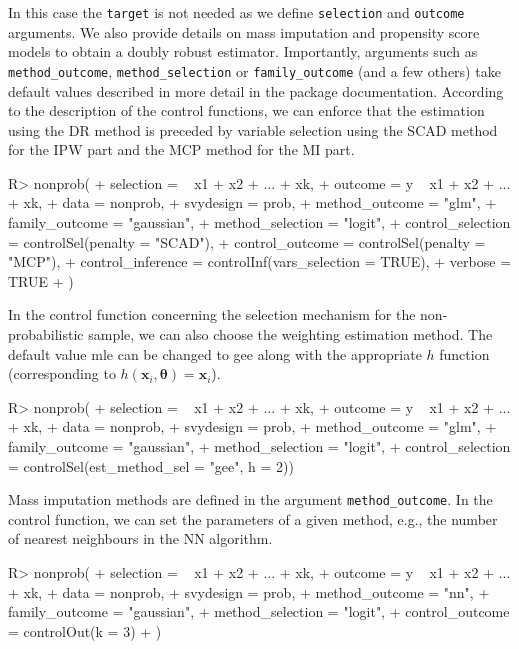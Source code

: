 \documentclass[
]{jss}
\begin{document}
In this case the \texttt{target} is not needed as we define
\texttt{selection} and \texttt{outcome} arguments. We also provide
details on mass imputation and propensity score models to obtain a
doubly robust estimator. Importantly, arguments such as
\texttt{method\_outcome}, \texttt{method\_selection} or
\texttt{family\_outcome} (and a few others) take default values
described in more detail in the package documentation. According to the
description of the control functions, we can enforce that the estimation
using the DR method is preceded by variable selection using the SCAD
method for the IPW part and the MCP method for the MI part.

\begin{CodeChunk}
\begin{CodeInput}
R> nonprob(
+   selection = ~ x1 + x2 + ... + xk, 
+   outcome = y ~ x1 + x2 + ... + xk, 
+   data = nonprob, 
+   svydesign = prob, 
+   method_outcome = "glm", 
+   family_outcome = "gaussian",
+   method_selection = "logit",
+   control_selection = controlSel(penalty = "SCAD"),
+   control_outcome = controlSel(penalty = "MCP"),
+   control_inference = controlInf(vars_selection = TRUE),
+   verbose = TRUE
+ )
\end{CodeInput}
\end{CodeChunk}

In the control function concerning the selection mechanism for the
non-probabilistic sample, we can also choose the weighting estimation
method. The default value mle can be changed to gee along with the
appropriate \(h\) function (corresponding to
\(h\left(\boldsymbol{x}_i, \boldsymbol{\theta}\right) = \boldsymbol{x}_i\)).

\begin{CodeChunk}
\begin{CodeInput}
R> nonprob(
+   selection = ~ x1 + x2 + ... + xk, 
+   outcome = y ~ x1 + x2 + ... + xk, 
+   data = nonprob, 
+   svydesign = prob, 
+   method_outcome = "glm", 
+   family_outcome = "gaussian",
+   method_selection = "logit",
+   control_selection = controlSel(est_method_sel = "gee", h = 2))
\end{CodeInput}
\end{CodeChunk}

Mass imputation methods are defined in the argument
\texttt{method\_outcome}. In the control function, we can set the
parameters of a given method, e.g., the number of nearest neighbours in
the NN algorithm.

\begin{CodeChunk}
\begin{CodeInput}
R> nonprob(
+   selection = ~ x1 + x2 + ... + xk, 
+   outcome = y ~ x1 + x2 + ... + xk, 
+   data = nonprob, 
+   svydesign = prob, 
+   method_outcome = "nn",
+   family_outcome = "gaussian",
+   method_selection = "logit",
+   control_outcome = controlOut(k = 3)
+ )
\end{CodeInput}
\end{CodeChunk}
\end{document}
